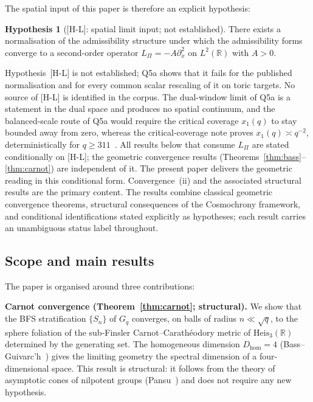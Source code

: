 \documentclass[11pt,a4paper]{article}
\theoremstyle{definition}
\newtheorem{hypothesis}[theorem]{Hypothesis}
\theoremstyle{remark}
\newcommand{\HeisR}{\mathrm{Heis}_3(\mathbb{R})}
\newcommand{\LPi}{L_\Pi}
\newcommand{\Gq}{G_q}
\newcommand{\Sn}{S_n}
\newcommand{\Dhom}{D_{\mathrm{hom}}}
\begin{document}
    The spatial input of this paper is therefore an explicit hypothesis:
    \begin{hypothesis}[{[H-L]}: spatial limit input; not established]
      \label{hyp:HL}
      There exists a normalisation of the admissibility structure under which the
      admissibility forms converge to a second-order operator $\LPi = -A\partial_x^2$ on
      $L^2(\mathbb{R})$ with $A > 0$.
    \end{hypothesis}
    Hypothesis~[H-L] is not established; Q5a shows that it fails for the published
    normalisation and for every common scalar rescaling of it on toric targets.
    No source of [H-L] is identified in the corpus.
    The dual-window limit of Q5a is a statement in the dual space and produces no spatial continuum, and the
    balanced-scale route of Q5a would require the critical coverage $x_1(q)$ to stay bounded away from zero, whereas
    the critical-coverage note proves $x_1(q) \asymp q^{-2}$, deterministically for $q \ge 311$~\cite{Beau2026ccnote}.
    All results below that consume $\LPi$ are stated conditionally on [H-L]; the geometric
    convergence results (Theorems~\ref{thm:bass}--\ref{thm:carnot}) are independent of it.
    The present paper delivers the geometric reading in this conditional form.
    Convergence~(ii) and the associated structural results are the primary content.
    The results combine classical geometric convergence theorems, structural consequences
    of the Cosmochrony framework, and conditional identifications stated explicitly as
    hypotheses; each result carries an unambiguous status label throughout.

  \subsection{Scope and main results}

    The paper is organised around three contributions:

    \medskip
    \noindent\textbf{Carnot convergence (Theorem~\ref{thm:carnot}; structural).}
    We show that the BFS stratification $\{\Sn\}$ of $\Gq$ converges, on balls of radius $n \ll \sqrt q$, to the
    sphere foliation of the sub-Finsler Carnot--Car\-a\-th\'{e}o\-do\-ry metric of $\HeisR$ determined by the
    generating set.
    The homogeneous dimension $\Dhom = 4$ (Bass--Guivarc'h~\cite{Bass1972,Guivarch1973})
    gives the limiting geometry the spectral dimension of a four-dimensional space.
    This result is structural: it follows from the theory of asymptotic cones of nilpotent
    groups (Pansu~\cite{Pansu1983}) and does not require any new hypothesis.
\end{document}
